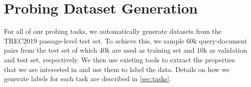 \section{Probing Dataset Generation}
\label{sec:dataset_gen}
For all of our probing tasks, we automatically generate datasets from the TREC2019 passage-level test set. To achieve this, we sample $60$k query-document pairs from the test set of which $40$k are used as training set and $10$k as validation and test set, respectively. We then use existing tools to extract the properties that we are interested in and use them to label the data. Details on how we generate labels for each task are described in \autoref{sec:tasks}.


